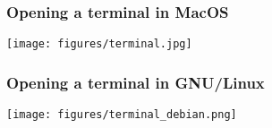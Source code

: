 \documentclass{beamer}
\begin{document}
\begin{frame}
  \frametitle{Opening a terminal in MacOS}
\centering
\texttt{[image: figures/terminal.jpg]}
\end{frame}

\begin{frame}
  \frametitle{Opening a terminal in GNU/Linux}
\centering
\texttt{[image: figures/terminal\_debian.png]}
\end{frame}












\end{document}
